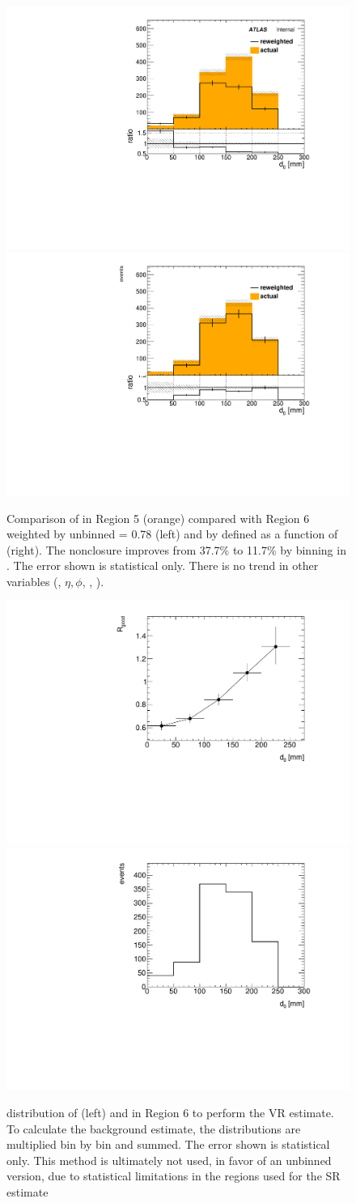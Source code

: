 \begin{figure}[!ht]
\centering
\includegraphics[width=.48\textwidth]{figures/cosmics/ratio_d0.pdf}
\includegraphics[width=.48\textwidth]{figures/cosmics/d0_ratio_binned.pdf}
\caption{Comparison of \absdz in Region 5 (orange) compared with Region 6 weighted by unbinned \rgood = 0.78 (left) and by \rgood defined as a function of \absdz (right). The nonclosure improves from 37.7\% to 11.7\% by binning \rgood in \absdz. The error shown is statistical only. There is no trend in other variables (\pt, $\eta, \phi$, \z, \tavg).}
\label{fig:cos-nonclosure-plots}
\end{figure}

\begin{figure}[!ht]
\centering
\includegraphics[width=.48\textwidth]{figures/cosmics/d0_VR_v4_rgood.pdf}
\includegraphics[width=.48\textwidth]{figures/cosmics/d0_VR_v4_2mu.pdf}
\caption{\absdz distribution of \rgood (left) and \mt in Region 6 to perform the VR estimate. To calculate the background estimate, the distributions are multiplied bin by bin and summed. The error shown is statistical only. This method is ultimately not used, in favor of an unbinned version, due to statistical limitations in the regions used for the SR estimate}
\label{fig:VR-rgood}
\end{figure}

